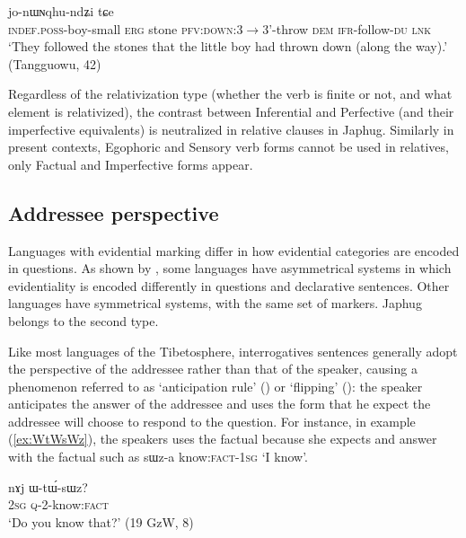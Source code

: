 \documentclass[oldfontcommands,oneside,a4paper,11pt]{article}
\newcommand{\ipa}[1]{{\phon \mbox{#1}}} %
\newcommand{\refb}[1]{(\ref{#1})}
\begin{document}
\begin{exe}
\ex  \label{ex:paBde}
\gll  [\ipa{tɤ-tɕɯ-pɯ} 	\ipa{kɯ} 	\ipa{rdɤstaʁ} 	\ipa{pa-βde}] 	\ipa{nɯ} 	\ipa{jo-nɯɴqhu-ndʑi} \ipa{tɕe} \\
\textsc{indef.poss}-boy-small \textsc{erg} stone \textsc{pfv:down}:3$\rightarrow$3'-throw \textsc{dem} \textsc{ifr}-follow-\textsc{du} \textsc{lnk} \\
\glt `They followed the stones that the little boy had thrown down (along the way).' (Tangguowu, 42)
\end{exe}

Regardless of the relativization type (whether the verb is finite or not, and what element is relativized), the contrast between Inferential and  Perfective (and their imperfective equivalents) is neutralized in relative clauses in Japhug. Similarly in present contexts, Egophoric and Sensory verb forms cannot be used in relatives, only Factual and Imperfective forms appear.

\subsection{Addressee perspective} \label{sec:anticipation}
Languages with evidential marking differ in how evidential categories are encoded in questions. As shown by \citet{sanroque15interrogativity}, some languages have asymmetrical systems in which evidentiality is encoded differently in questions and declarative sentences. Other languages have symmetrical systems, with the same set of markers. Japhug belongs to the second type. 

Like most languages of the Tibetosphere, interrogatives sentences generally adopt the perspective of the addressee rather than that of the speaker, causing a phenomenon referred to as `anticipation rule' (\citealt[244]{tournadre14evidentiality}) or `flipping' (\citealt{sanroque15interrogativity}):   the speaker anticipates the answer of the addressee and uses the form that he expect the addressee will choose to respond to the question. For instance, in example \refb{ex:WtWsWz}, the speakers uses the factual because she expects and answer with the factual such as \ipa{sɯz-a} know:\textsc{fact}-\textsc{1sg} `I know'.

\begin{exe}
\ex \label{ex:WtWsWz}
\gll 
\ipa{nɤj}	\ipa{ɯ-tɯ́-sɯz?} \\
\textsc{2sg} \textsc{q}-2-know:\textsc{fact} \\
\glt `Do you know that?' (19 GzW, 8)
\end{exe}
\end{document}
